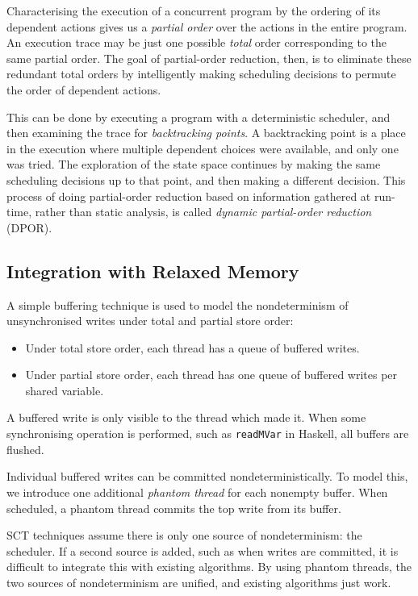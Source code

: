 Characterising the execution of a concurrent program by the ordering of its
dependent actions gives us a \emph{partial order} over the actions in the entire
program.  An execution trace may be just one possible \emph{total} order
corresponding to the same partial order.  The goal of partial-order reduction,
then, is to eliminate these redundant total orders by intelligently making
scheduling decisions to permute the order of dependent actions.

This can be done by executing a program with a deterministic scheduler, and then
examining the trace for \emph{backtracking points}.  A backtracking point is a
place in the execution where multiple dependent choices were available, and only
one was tried.  The exploration of the state space continues by making the same
scheduling decisions up to that point, and then making a different decision.
This process of doing partial-order reduction based on information gathered at
run-time, rather than static analysis, is called \emph{dynamic partial-order
  reduction} (DPOR).

\subsection{Integration with Relaxed Memory}

A simple buffering technique is used to model the nondeterminism of
unsynchronised writes under total and partial store order\cite{zhang2015}:

\begin{itemize}
\item Under total store order, each thread has a queue of buffered writes.
\item Under partial store order, each thread has one queue of buffered writes
  per shared variable.
\end{itemize}

A buffered write is only visible to the thread which made it.  When some
synchronising operation is performed, such as \verb|readMVar| in Haskell, all
buffers are flushed.

Individual buffered writes can be committed nondeterministically.  To model
this, we introduce one additional \emph{phantom thread} for each nonempty
buffer.  When scheduled, a phantom thread commits the top write from its buffer.

SCT techniques assume there is only one source of nondeterminism: the scheduler.
If a second source is added, such as when writes are committed, it is difficult
to integrate this with existing algorithms.  By using phantom threads, the two
sources of nondeterminism are unified, and existing algorithms just work.

